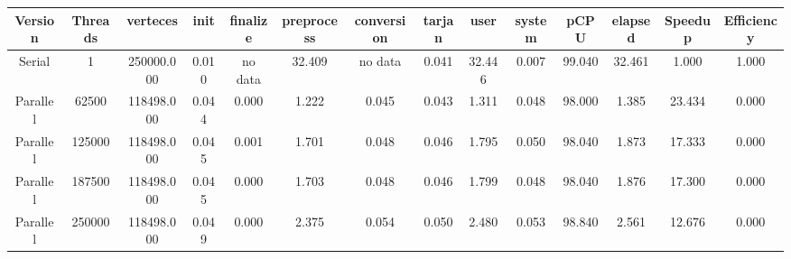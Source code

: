 \begin{tabular}{|c|c|c|c|c|c|c|c|c|c|c|c|c|c|}
\toprule
 Version &  Threads &   verteces &  init & finalize &  preprocess & conversion &  tarjan &   user &  system &   pCPU &  elapsed &  Speedup &  Efficiency \\
\midrule
  Serial &        1 & 250000.000 & 0.010 &  no data &      32.409 &    no data &   0.041 & 32.446 &   0.007 & 99.040 &   32.461 &    1.000 &       1.000 \\
Parallel &    62500 & 118498.000 & 0.044 &    0.000 &       1.222 &      0.045 &   0.043 &  1.311 &   0.048 & 98.000 &    1.385 &   23.434 &       0.000 \\
Parallel &   125000 & 118498.000 & 0.045 &    0.001 &       1.701 &      0.048 &   0.046 &  1.795 &   0.050 & 98.040 &    1.873 &   17.333 &       0.000 \\
Parallel &   187500 & 118498.000 & 0.045 &    0.000 &       1.703 &      0.048 &   0.046 &  1.799 &   0.048 & 98.040 &    1.876 &   17.300 &       0.000 \\
Parallel &   250000 & 118498.000 & 0.049 &    0.000 &       2.375 &      0.054 &   0.050 &  2.480 &   0.053 & 98.840 &    2.561 &   12.676 &       0.000 \\
\bottomrule
\end{tabular}
